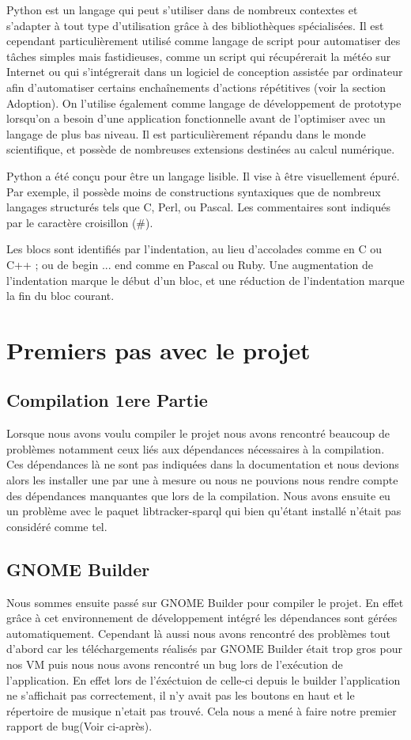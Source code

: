 \documentclass[12pt]{report}
\begin{document}
Python est un langage qui peut s'utiliser dans de nombreux contextes 
et s'adapter à tout type d'utilisation grâce à des bibliothèques 
spécialisées. Il est cependant particulièrement utilisé comme 
langage de script pour automatiser des tâches simples mais 
fastidieuses, comme un script qui récupérerait la météo sur Internet 
ou qui s'intégrerait dans un logiciel de conception assistée par 
ordinateur afin d'automatiser certains enchaînements d'actions 
répétitives (voir la section Adoption). On l'utilise également comme 
langage de développement de prototype lorsqu'on a besoin d'une 
application fonctionnelle avant de l'optimiser avec un langage 
de plus bas niveau. Il est particulièrement répandu dans le monde 
scientifique, et possède de nombreuses extensions destinées au 
calcul numérique.

Python a été conçu pour être un langage lisible. Il vise à être 
visuellement épuré. Par exemple, il possède moins de constructions 
syntaxiques que de nombreux langages structurés tels que C, 
Perl, ou Pascal. Les commentaires sont indiqués par le caractère 
croisillon (#).

Les blocs sont identifiés par l'indentation, au lieu d'accolades 
comme en C ou C++ ; ou de begin ... end comme en Pascal ou Ruby. 
Une augmentation de l'indentation marque le début d'un bloc, et 
une réduction de l'indentation marque la fin du bloc courant. 

\section{Premiers pas avec le projet}
\subsection{Compilation 1ere Partie}
Lorsque nous avons voulu compiler le projet nous avons rencontré 
beaucoup de problèmes notamment ceux liés aux dépendances nécessaires
à la compilation. Ces dépendances là ne sont pas indiquées dans la
documentation et nous devions alors les installer une par une à
mesure ou nous ne pouvions nous rendre compte des dépendances 
manquantes que lors de la compilation. 
Nous avons ensuite eu un problème avec le paquet libtracker-sparql
qui bien qu'étant installé n’était pas considéré comme tel.

\subsection{GNOME Builder}
Nous sommes ensuite passé sur GNOME Builder pour compiler le projet.
En effet grâce à cet environnement de développement intégré les 
dépendances sont gérées automatiquement. Cependant là aussi nous
avons rencontré des problèmes tout d'abord car les téléchargements
réalisés par GNOME Builder était trop gros pour nos VM puis nous 
nous avons rencontré un bug lors de l’exécution de l'application.
En effet lors de l'éxéctuion de celle-ci depuis le builder l'application
ne s'affichait pas correctement, il n'y avait pas les boutons en haut
et le répertoire de musique n'etait pas trouvé. Cela nous a mené à 
faire notre premier rapport de bug(Voir ci-après).
\end{document}
